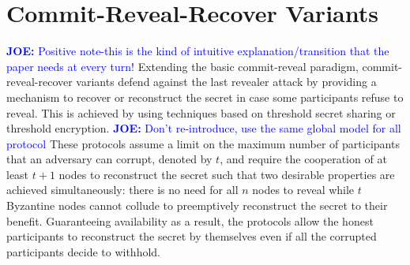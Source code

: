 \documentclass[letterpaper,twocolumn,10pt]{article}
\theoremstyle{definition}
\theoremstyle{remark}
\newcommand{\joenote}[1]{\textcolor{blue}{\textbf{JOE:} #1}}
\begin{document}
\section{Commit-Reveal-Recover Variants}
\label{section:commit-reveal-recover}
\joenote{Positive note-this is the kind of intuitive explanation/transition that the paper needs at every turn!}
Extending the basic commit-reveal paradigm, commit-reveal-recover variants defend against the last revealer attack by providing a mechanism to recover or reconstruct the secret in case some participants refuse to reveal. This is achieved by using techniques based on threshold secret sharing or threshold encryption. \joenote{Don't re-introduce, use the same global model for all protocol} These protocols assume a limit on the maximum number of participants that an adversary can corrupt, denoted by $t$, and require the cooperation of at least $t + 1$ nodes to reconstruct the secret such that two desirable properties are achieved simultaneously: there is no need for all $n$ nodes to reveal while $t$ Byzantine nodes cannot collude to preemptively reconstruct the secret to their benefit. Guaranteeing availability as a result, the protocols allow the honest participants to reconstruct the secret by themselves even if all the corrupted participants decide to withhold.
\end{document}
